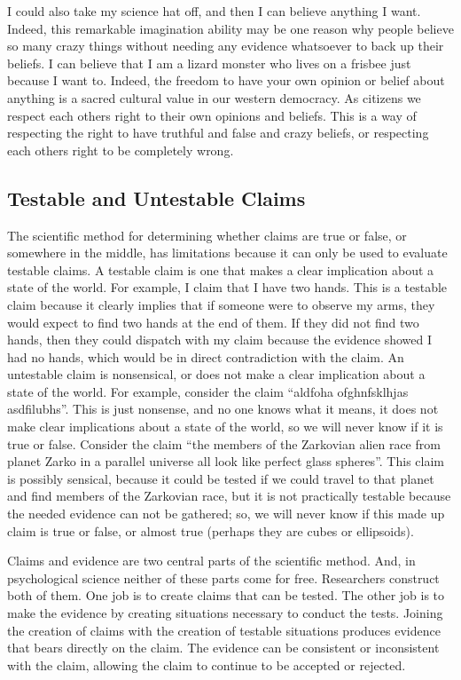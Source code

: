 \documentclass[]{book}
\theoremstyle{definition}
\theoremstyle{definition}
\theoremstyle{remark}
\begin{document}
I could also take my science hat off, and then I can believe anything I
want. Indeed, this remarkable imagination ability may be one reason why
people believe so many crazy things without needing any evidence
whatsoever to back up their beliefs. I can believe that I am a lizard
monster who lives on a frisbee just because I want to. Indeed, the
freedom to have your own opinion or belief about anything is a sacred
cultural value in our western democracy. As citizens we respect each
others right to their own opinions and beliefs. This is a way of
respecting the right to have truthful and false and crazy beliefs, or
respecting each others right to be completely wrong.

\subsection{Testable and Untestable
Claims}\label{testable-and-untestable-claims}

The scientific method for determining whether claims are true or false,
or somewhere in the middle, has limitations because it can only be used
to evaluate testable claims. A testable claim is one that makes a clear
implication about a state of the world. For example, I claim that I have
two hands. This is a testable claim because it clearly implies that if
someone were to observe my arms, they would expect to find two hands at
the end of them. If they did not find two hands, then they could
dispatch with my claim because the evidence showed I had no hands, which
would be in direct contradiction with the claim. An untestable claim is
nonsensical, or does not make a clear implication about a state of the
world. For example, consider the claim ``aldfoha ofghnfsklhjas
asdfilubhs''. This is just nonsense, and no one knows what it means, it
does not make clear implications about a state of the world, so we will
never know if it is true or false. Consider the claim ``the members of
the Zarkovian alien race from planet Zarko in a parallel universe all
look like perfect glass spheres''. This claim is possibly sensical,
because it could be tested if we could travel to that planet and find
members of the Zarkovian race, but it is not practically testable
because the needed evidence can not be gathered; so, we will never know
if this made up claim is true or false, or almost true (perhaps they are
cubes or ellipsoids).

Claims and evidence are two central parts of the scientific method. And,
in psychological science neither of these parts come for free.
Researchers construct both of them. One job is to create claims that can
be tested. The other job is to make the evidence by creating situations
necessary to conduct the tests. Joining the creation of claims with the
creation of testable situations produces evidence that bears directly on
the claim. The evidence can be consistent or inconsistent with the
claim, allowing the claim to continue to be accepted or rejected.
\end{document}
